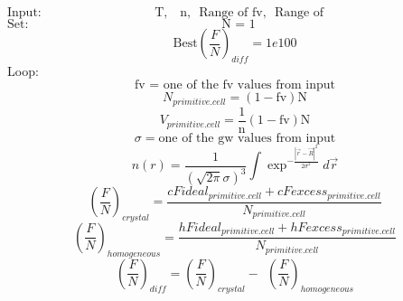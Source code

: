 \documentclass[double,12pt]{beavtex}
\begin{document}
\begin{displaymath}\text{Input:~~~~~~~~~~~~~~~~~~~~~~~~~~~T,~~ n,~~Range of fv,~~Range of gw~~~~~~~~~~~~~~~~~~~~~~~~~~~~~~~~~~~}\end{displaymath} 
\begin{displaymath}\text{Set:~~~~~~~~~~~~~~~~~~~~~~~~~~~~~~~~~~~~~~~~~~~~~~N~=~1~~~~~~~~~~~~~~~~~~~~~~~~~~~~~~~~~~~~~~~~~~~~~~~~~~~~}\end{displaymath} 
\begin{displaymath}\text{Best}\left(\frac{F}{N}\right)_{diff}= 1e100\end{displaymath}
Loop: 
\begin{displaymath}\text{fv = one of the fv values from input}\end{displaymath}
\begin{equation}N_{primitive.cell}=(1-\text{fv})\text{N}\end{equation}
\begin{equation}V_{primitive.cell}=\frac{\text{1}}{\text{n}}(1-\text{fv})\text{N}\end{equation}
\begin{displaymath}\sigma = \text{one of the gw values from input}\end{displaymath}
\begin{equation}{n(r)=\frac{1}{\left(\sqrt{2\pi}\sigma\right)^3}\int\exp^{-\frac{|\vec{r}-\vec{R}|^2}{2\sigma^2}}d\vec{r}}\end{equation} 
\begin{equation}\left(\frac{F}{N}\right)_{crystal}=\frac{cFideal_{primitive.cell} + cFexcess_{primitive.cell}}{N_{primitive.cell}}\end{equation}
\begin{equation}\left(\frac{F}{N}\right)_{homogeneous}=\frac{hFideal_{primitive.cell} + hFexcess_{primitive.cell}}{N_{primitive.cell}}\end{equation}
\begin{equation}\left(\frac{F}{N}\right)_{diff}=\left(\frac{F}{N}\right)_{crystal}-{~~}\left(\frac{F}{N}\right)_{homogeneous}\end{equation}
\end{document}
